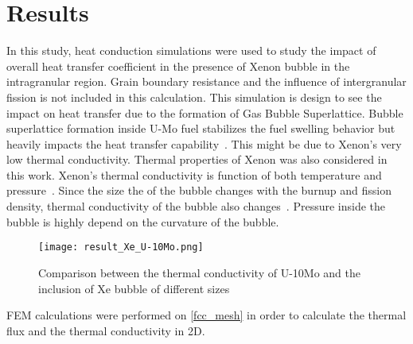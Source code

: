 \section{Results}
\begin{doublespacing}
In this study, heat conduction simulations were used to study the impact of overall heat transfer coefficient in the presence of Xenon bubble in the intragranular region. Grain boundary resistance and the influence of intergranular fission is not included in this calculation. This simulation is design to see the impact on heat transfer due to the formation of Gas Bubble Superlattice. Bubble superlattice formation inside U-Mo fuel stabilizes the fuel swelling behavior but heavily impacts the heat transfer capability~\cite{burkes2015thermal}. This might be due to Xenon's very low thermal conductivity. Thermal properties of Xenon was also considered in this work. Xenon's thermal conductivity is function of both temperature and pressure~\cite{rabinovich1987thermophysical}. Since the size the of the bubble changes with the burnup and fission density, thermal conductivity of the bubble also changes~\cite{miller2012advantages}. Pressure inside the bubble is highly depend on the curvature of the bubble.

\begin{figure}[H]
\centering
\texttt{[image: result\_Xe\_U-10Mo.png]}
\caption{Comparison between the thermal conductivity of U-10Mo and the inclusion of Xe bubble of different sizes}
\label{fig_result}
\end{figure}

FEM calculations were performed on \ref{fcc_mesh} in order to calculate the thermal flux and the thermal conductivity in 2D. 

\end{doublespacing}
